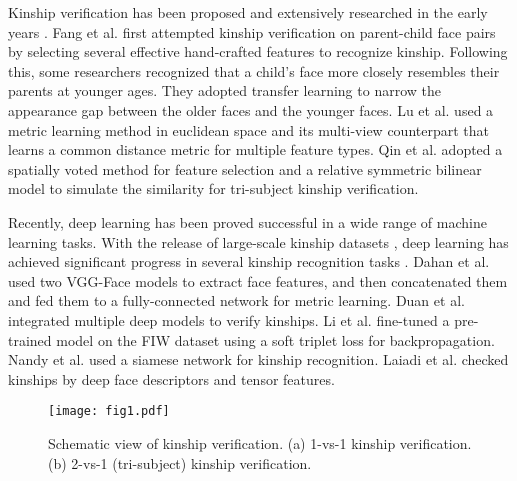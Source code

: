 \documentclass[a4paper, 10pt, conference]{ieeeconf}      %
\begin{document}
Kinship verification has been proposed and extensively researched in the early years \cite{c3,c4,c5,c6,c24,c25,c26,c27,c28,c29,c30}. Fang et al. \cite{c3} first attempted kinship verification on parent-child face pairs by selecting several effective hand-crafted features to recognize kinship. Following this, some researchers \cite{c4, c5} recognized that a child’s face more closely resembles their parents at younger ages. They adopted transfer learning to 
narrow the appearance gap between the older faces and the 
younger faces. Lu et al. \cite{c6} used a metric learning method in euclidean space and its multi-view counterpart that learns a common distance metric for multiple feature types. Qin et al. \cite{c19} adopted a spatially voted method for feature selection and a relative symmetric bilinear model to simulate the similarity for tri-subject kinship verification.

Recently, deep learning \cite{c7} has been proved successful in a wide range of machine learning tasks. With the release of large-scale kinship datasets \cite{c8}, deep learning has achieved significant progress in several kinship recognition tasks \cite{c9,c10,c11,c13,c14,c15,c16,c31,c32,c33,c34,c35}. Dahan et al. \cite{c11} used two VGG-Face \cite{c12} models to extract face features, and then concatenated them and fed them to a fully-connected network for metric learning. Duan et al. \cite{c13} integrated multiple deep models to verify kinships. Li et al. \cite{c14} fine-tuned a pre-trained model on the FIW dataset using a soft triplet loss for backpropagation. Nandy et al. \cite{c15} used a siamese network for kinship recognition. Laiadi et al. \cite{c16} checked kinships by deep face descriptors and tensor features.

\begin{figure}[t]
\setlength{\abovecaptionskip}{0.0cm}
\setlength{\belowcaptionskip}{-0.1cm}
\begin{minipage}[b]{1.0\linewidth}
  \centering
  \centerline{\texttt{[image: fig1.pdf]}}
\end{minipage}
\caption{Schematic view of kinship verification. (a) 1-vs-1 kinship verification. (b) 2-vs-1 (tri-subject) kinship verification.}
\label{fig:fig1}
\end{figure}
\end{document}
